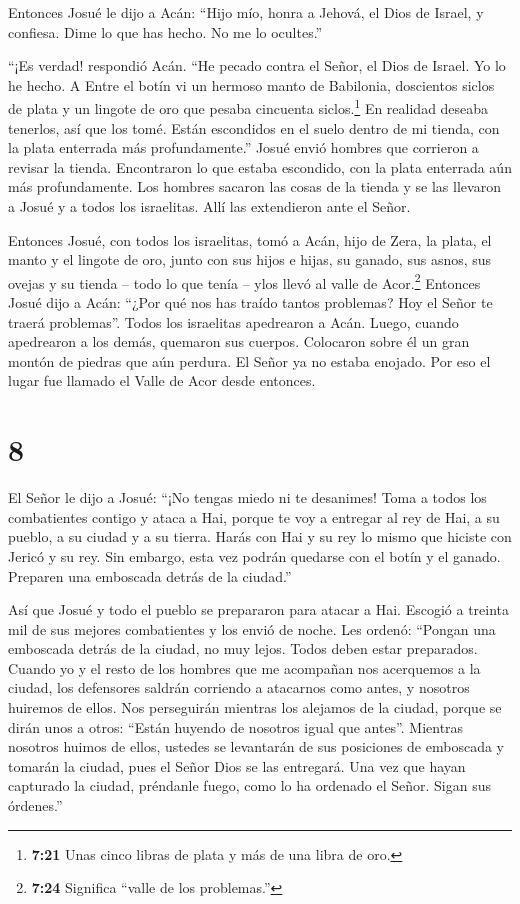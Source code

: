  Entonces Josué le dijo a Acán: ``Hijo mío, honra a Jehová,
el Dios de Israel, y confiesa. Dime lo que has hecho. No me lo
ocultes.''

 ``¡Es verdad! respondió Acán. ``He pecado contra el Señor,
el Dios de Israel. Yo lo he hecho.  A Entre el botín vi un
hermoso manto de Babilonia, doscientos siclos de plata y un lingote de
oro que pesaba cincuenta siclos.\footnote{\textbf{7:21} Unas cinco
  libras de plata y más de una libra de oro.} En realidad deseaba
tenerlos, así que los tomé. Están escondidos en el suelo dentro de mi
tienda, con la plata enterrada más profundamente.''  Josué
envió hombres que corrieron a revisar la tienda. Encontraron lo que
estaba escondido, con la plata enterrada aún más profundamente.
 Los hombres sacaron las cosas de la tienda y se las
llevaron a Josué y a todos los israelitas. Allí las extendieron ante el
Señor.

 Entonces Josué, con todos los israelitas, tomó a Acán,
hijo de Zera, la plata, el manto y el lingote de oro, junto con sus
hijos e hijas, su ganado, sus asnos, sus ovejas y su tienda -- todo lo
que tenía -- ylos llevó al valle de Acor.\footnote{\textbf{7:24}
  Significa ``valle de los problemas.''}  Entonces Josué
dijo a Acán: ``¿Por qué nos has traído tantos problemas? Hoy el Señor te
traerá problemas''. Todos los israelitas apedrearon a Acán. Luego,
cuando apedrearon a los demás, quemaron sus cuerpos. 
Colocaron sobre él un gran montón de piedras que aún perdura. El Señor
ya no estaba enojado. Por eso el lugar fue llamado el Valle de Acor
desde entonces.

\hypertarget{section-7}{%
\section{8}\label{section-7}}

 El Señor le dijo a Josué: ``¡No tengas miedo ni te
desanimes! Toma a todos los combatientes contigo y ataca a Hai, porque
te voy a entregar al rey de Hai, a su pueblo, a su ciudad y a su tierra.
 Harás con Hai y su rey lo mismo que hiciste con Jericó y su
rey. Sin embargo, esta vez podrán quedarse con el botín y el ganado.
Preparen una emboscada detrás de la ciudad.''

 Así que Josué y todo el pueblo se prepararon para atacar a
Hai. Escogió a treinta mil de sus mejores combatientes y los envió de
noche.  Les ordenó: ``Pongan una emboscada detrás de la
ciudad, no muy lejos. Todos deben estar preparados.  Cuando
yo y el resto de los hombres que me acompañan nos acerquemos a la
ciudad, los defensores saldrán corriendo a atacarnos como antes, y
nosotros huiremos de ellos.  Nos perseguirán mientras los
alejamos de la ciudad, porque se dirán unos a otros: ``Están huyendo de
nosotros igual que antes''.  Mientras nosotros huimos de
ellos, ustedes se levantarán de sus posiciones de emboscada y tomarán la
ciudad, pues el Señor Dios se las entregará.  Una vez que
hayan capturado la ciudad, préndanle fuego, como lo ha ordenado el
Señor. Sigan sus órdenes.''


